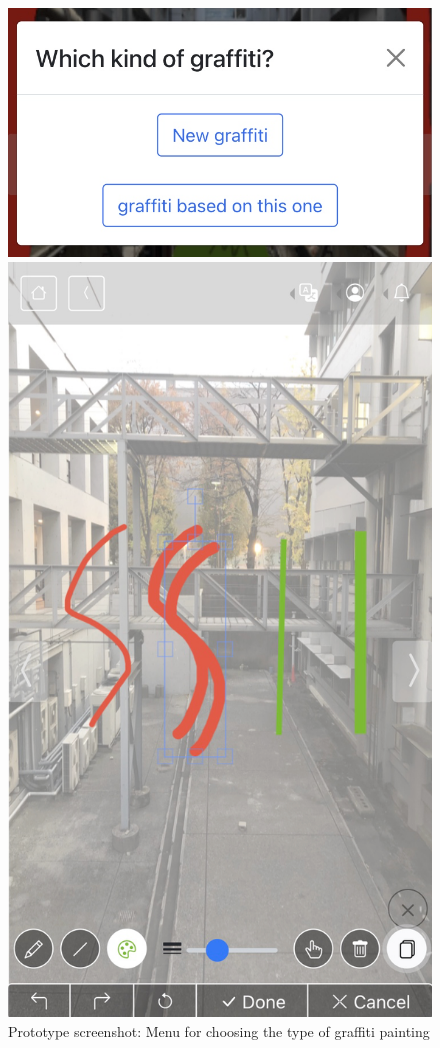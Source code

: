 \begin{figure}
  \begin{minipage}{0.32\textwidth}
    \centering
    \includegraphics[width=0.9\linewidth]{resources/4_methodology/prototype_choose_graffiti_type.png}
      \caption{Prototype screenshot: Menu for choosing the type of graffiti painting}
  \end{minipage}\hfill
  \begin{minipage}{0.32\textwidth}
    \centering
    \includegraphics[width=0.9\linewidth]{resources/4_methodology/prototype_canvas.png}

\end{minipage}
\end{figure}
